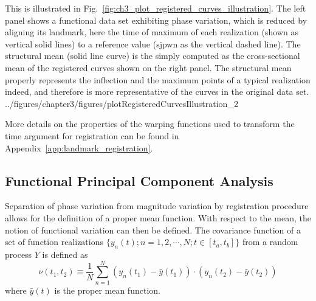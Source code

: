 This is illustrated in Fig.~\ref{fig:ch3_plot_registered_curves_illustration}.
The left panel shows a functional data set exhibiting phase variation, which is reduced by aligning its landmark, here the time of maximum of each realization (shown as vertical solid lines) to a reference value (sjpwn as the vertical dashed line).
The structural mean (solid line curve) is the simply computed as the cross-sectional mean of the registered curves shown on the right panel. 
The structural mean properly represents the inflection and the maximum points of a typical realization indeed, and therefore is more representative of the curves in the original data set.
{../figures/chapter3/figures/plotRegisteredCurvesIllustration_2}

More details on the properties of the warping functions used to transform the time argument for registration can be found in Appendix~\ref{app:landmark_registration}.

\subsection{Functional Principal Component Analysis}\label{sub:sa_fpca}

Separation of phase variation from magnitude variation by registration procedure allows for the definition of a proper mean function.
With respect to the mean, the notion of functional variation can then be defined.
The covariance function of a set of function realizations $\{y_n(t);n = 1, 2, \cdots, N; t \in [t_a,t_b]\}$ from a random process $Y$ is defined as
\begin{equation}
	\nu (t_1, t_2) \equiv \frac{1}{N} \sum_{n=1}^{N} (y_n(t_1) - \bar{y}(t_1)) \cdot (y_n(t_2) - \bar{y}(t_2))
\label{eq:covariance_function}
\end{equation}
where $\bar{y} (t)$ is the proper mean function.

